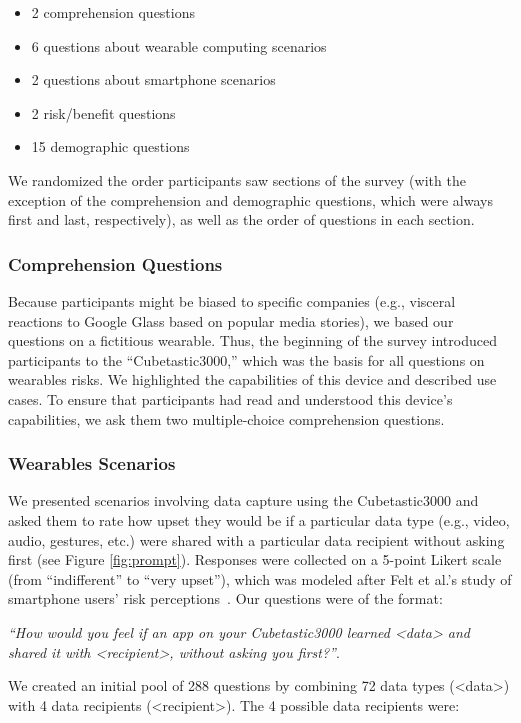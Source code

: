 \documentclass{acm_proc_article-sp}
\begin{document}
\begin{itemize} \itemsep1pt \parskip0pt 
\item 2 comprehension questions
\item 6 questions about wearable computing scenarios 
\item 2 questions about smartphone scenarios 
\item 2 risk/benefit questions 
\item 15 demographic questions \\[-.8cm]
\end{itemize}

We randomized the order participants saw sections of the survey (with the exception of the comprehension and demographic questions, which were always first and last, respectively), as well as the order of questions in each section.

\subsubsection{Comprehension Questions}
Because participants might be biased to specific companies (e.g., visceral reactions to Google Glass based on popular media stories), we based our questions on a fictitious wearable. Thus, the beginning of the survey introduced participants to the ``Cubetastic3000,'' which was the basis for all questions on wearables risks. We highlighted the capabilities of this device and described use cases. To ensure that participants had read and understood this device's capabilities, we ask them two multiple-choice comprehension questions.

\subsubsection{Wearables Scenarios}
We presented scenarios involving data capture using the Cubetastic3000 and asked them to rate how upset they would be if a particular data type (e.g., video, audio, gestures, etc.) were shared with a particular data recipient without asking first (see Figure \ref{fig:prompt}). Responses were collected on a 5-point Likert scale (from ``indifferent'' to ``very upset''), which was modeled after Felt et al.'s study of smartphone users' risk perceptions~\cite{Felt}. Our questions were of the format: 

\textit{``How would you feel if an app on your Cubetastic3000 learned <data> and shared it with <recipient>, without asking you first?''}. 

We created an initial pool of 288 questions by combining 72 data types (<data>) with 4 data recipients (<recipient>). The 4 possible data recipients were: \\[-.8cm]
\end{document}
